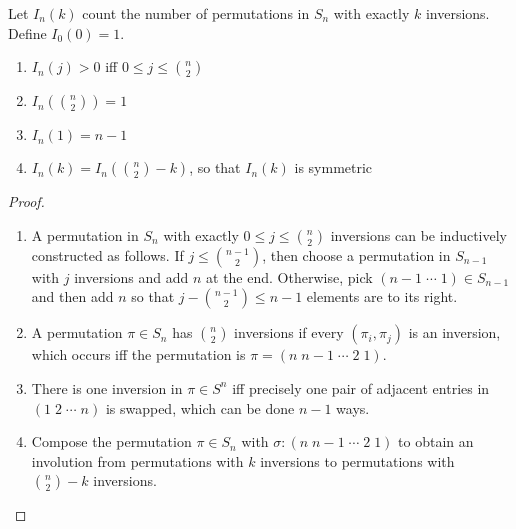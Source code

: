 \documentclass[a4paper]{article}
\begin{document}
\begin{definition}
Let $I_n(k)$ count the number of permutations in $S_n$ with exactly $k$ inversions. Define $I_0(0)=1$.
\end{definition}


\begin{theorem}
\;
\begin{enumerate}
\item $\displaystyle I_n(j)>0$ iff $0\leq j\leq\binom n2$
\item $\displaystyle I_n\left(\binom n2\right)=1$
\item $\displaystyle I_n(1)=n-1$
\item $\displaystyle I_n(k)=I_n\left(\binom n2-k\right)$, so that $I_n(k)$ is symmetric
\end{enumerate}

\begin{hl}
\begin{proof}
\;
\begin{enumerate}
\item A permutation in $S_n$ with exactly $0\leq j\leq\binom n2$ inversions can be inductively constructed as follows. If $j\leq\binom{n-1}2$, then choose a permutation in $S_{n-1}$ with $j$ inversions and add $n$ at the end. Otherwise, pick $(n-1\;\cdots\;1)\in S_{n-1}$ and then add $n$ so that $j-\binom{n-1}2\leq n-1$ elements are to its right.
\item A permutation $\pi\in S_n$ has $\binom n2$ inversions if every $(\pi_i,\pi_j)$ is an inversion, which occurs iff the permutation is $\pi=(n\;n-1\;\cdots\;2\;1)$.
\item There is one inversion in $\pi\in S^n$ iff precisely one pair of adjacent entries in $(1\;2\;\cdots\;n)$ is swapped, which can be done $n-1$ ways.
\item Compose the permutation $\pi\in S_n$ with $\sigma:(n\;n-1\;\cdots\;2\;1)$ to obtain an involution from permutations with $k$ inversions to permutations with $\binom n2-k$ inversions.
\end{enumerate}
\end{proof}
\end{hl}
\end{theorem}
\end{document}
